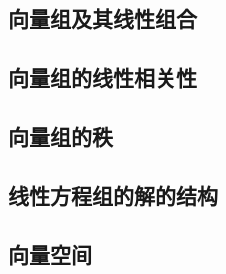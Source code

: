\subsection{向量组及其线性组合}
\paragraph{}

\subsection{向量组的线性相关性}
\paragraph{}

\subsection{向量组的秩}
\paragraph{}

\subsection{线性方程组的解的结构}
\paragraph{}

\subsection{向量空间}
\paragraph{}
